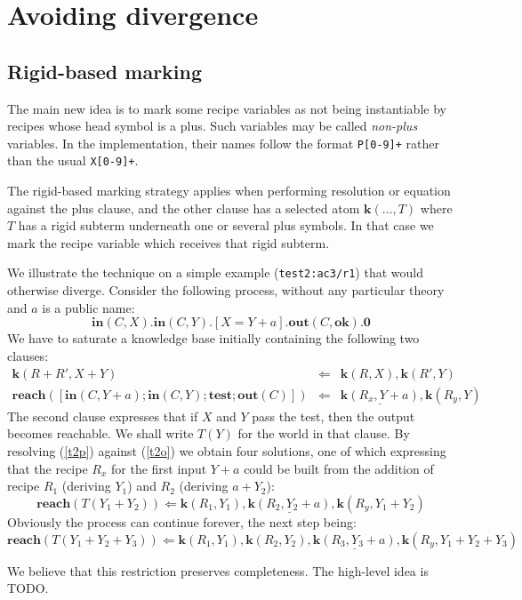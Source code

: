 \documentclass{article}
\newcommand{\mathcst}[1]{\mathrm{\textbf{#1}}}
\newcommand{\knows}{\mathcst{k}}
\newcommand{\reach}{\mathcst{reach}}
\newcommand{\from}{\Leftarrow}
\renewcommand{\in}{\mathcst{in}}
\newcommand{\out}{\mathcst{out}}
\newcommand{\test}{\mathcst{test}}
\newcommand{\ok}{\mathcst{ok}}
\newcommand{\zerop}{\mathbf{0}}
\begin{document}
\section{Avoiding divergence}

\subsection{Rigid-based marking}

The main new idea is to mark some recipe variables as not
being instantiable by recipes whose head symbol is a plus.
Such variables may be called \emph{non-plus} variables.
In the implementation,
their names follow the format \verb$P[0-9]+$ rather than
the usual \verb$X[0-9]+$.

The rigid-based marking strategy applies when performing resolution
or equation against the plus clause,
and the other clause has a selected atom $\knows(\ldots,T)$
where $T$ has a rigid subterm
underneath one or several plus symbols.
In that case we mark the recipe variable which receives that
rigid subterm.

We illustrate the technique on a simple example (\verb#test2:ac3/r1#)
that would otherwise diverge.
Consider the following process, without any particular theory
and $a$ is a public name:
\[
  \in(C,X).\in(C,Y).[X=Y+a].\out(C,\ok).\zerop
\]
We have to saturate a knowledge base initially containing
the following two clauses:
\begin{eqnarray}
  \knows(R+R',X+Y) &\from& \knows(R,X), \knows(R',Y) \label{t2p} \\
  \reach([\in(C,Y+a);\in(C,Y);\test;\out(C)]) &\from&
     \underline{\knows(R_x,Y+a)}, \knows(R_y,Y) \label{t2o}
\end{eqnarray}
The second clause expresses that if $X$ and $Y$ pass the test, then
the output becomes reachable. We shall write $T(Y)$ for the world in that 
clause.
By resolving (\ref{t2p}) against (\ref{t2o}) we obtain four solutions,
one of which expressing that
the recipe $R_x$ for the first input $Y+a$ could be built from
the addition of recipe $R_1$ (deriving $Y_1$) and $R_2$ (deriving $a+Y_2$):
\[
\reach(T(Y_1+Y_2)) \from
\knows(R_1,Y_1), \underline{\knows(R_2,Y_2+a)},
\knows(R_y,Y_1+Y_2) \]
Obviously the process can continue forever, the next step being:
\[ \reach(T(Y_1+Y_2+Y_3)) \from
 \knows(R_1,Y_1), \knows(R_2,Y_2), \underline{\knows(R_3,Y_3+a)},
 \knows(R_y,Y_1+Y_2+Y_3) \]

We believe that this restriction preserves completeness.
The high-level idea is TODO.
\end{document}

